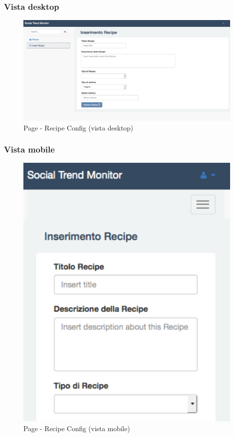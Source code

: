 		\subsubsection{Vista desktop} %
		\begin{figure}[htbp]
			\centering
			\centerline{\includegraphics[scale=0.4]{./images/mockup/recipe_config_vd.pdf}}
			\caption{Page - Recipe Config (vista desktop)}
		\end{figure}

		\subsubsection{Vista mobile} %
		\begin{figure}[htbp]
			\centering
			\centerline{\includegraphics[scale=0.5]{./images/mockup/recipe_config_vm.pdf}}
			\caption{Page - Recipe Config (vista mobile)}
		\end{figure}


